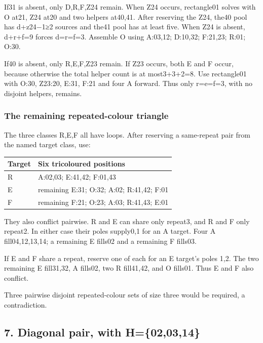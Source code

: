 \documentclass[
  10pt,
]{article}
\begin{document}
If31 is absent, only D,R,F,Z24 remain. When Z24 occurs,
rectangle01 solves with O at21, Z24 at20 and two helpers
at40,41. After reserving the Z24, the40 pool has d+z24−1≥2 sources and
the41 pool has at least five. When Z24 is absent, d+r+f=9 forces
d=r=f=3. Assemble O using A:03,12; D:10,32; F:21,23; R:01; O:30.

If40 is absent, only R,E,F,Z23 remain. If Z23 occurs, both E and F
occur, because otherwise the total helper count is at most3+3+2=8. Use
rectangle01 with O:30, Z23:20, E:31, F:21 and four A forward.
Thus only r=e=f=3, with no disjoint helpers, remains.

\hypertarget{the-remaining-repeated-colour-triangle}{%
\subsubsection*{The remaining repeated-colour
triangle}\label{the-remaining-repeated-colour-triangle}}

The three classes R,E,F all have loops. After reserving a same-repeat
pair from the named target class, use:

\begin{longtable}[]{@{}ll@{}}
\toprule\noalign{}
Target & Six tricoloured positions \\
\midrule\noalign{}
\endhead
\bottomrule\noalign{}
\endlastfoot
R & A:02,03; E:41,42; F:01,43 \\
E & remaining E:31; O:32; A:02; R:41,42; F:01 \\
F & remaining F:21; O:23; A:03; R:41,43; E:01 \\
\end{longtable}

They also conflict pairwise. R and E can share only repeat3, and R and F
only repeat2. In either case their poles supply0,1 for an A target. Four
A fill04,12,13,14; a remaining E fills02 and a remaining F fills03.

If E and F share a repeat, reserve one of each for an E target's poles
1,2. The two remaining E fill31,32, A fills02, two R fill41,42, and O
fills01. Thus E and F also conflict.

Three pairwise disjoint repeated-colour sets of size three would be
required, a contradiction.

\hypertarget{diagonal-pair-with-h020314-1}{%
\subsection*{7. Diagonal pair, with
H=\{02,03,14\}}\label{diagonal-pair-with-h020314-1}}
\end{document}
